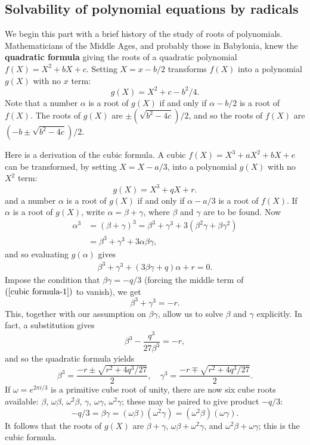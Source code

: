 \subsection{Solvability of polynomial equations by radicals}
We begin this part with a brief history of the study of roots of polynomials. Mathematicians of the Middle Ages, and probably those in Babylonia, knew the \textbf{quadratic formula} giving the roots of a quadratic polynomial $f(X)=X^2+bX+c$. Setting $X=x-b/2$ transforms $f(X)$ into a polynomial $g(X)$ with no $x$ term:
\[g(X)=X^2+c-b^2/4.\]
Note that a number $\alpha$ is a root of $g(X)$ if and only if $\alpha-b/2$ is a root of $f(X)$. The roots of $g(X)$ are $\pm(\sqrt{b^2-4c})/2$, and so the roots of $f(X)$ are $(-b\pm\sqrt{b^2-4c})/2$.\par
Here is a derivation of the cubic formula. A cubic $f(X)=X^3+aX^2+bX+e$ can be transformed, by setting $X=X-a/3$, into a polynomial $g(X)$ with no $X^2$ term:
\[g(X)=X^3+qX+r.\]
and a number $\alpha$ is a root of $g(X)$ if and only if $\alpha-a/3$ is a root of $f(X)$. If $\alpha$ is a root of $g(X)$, write $\alpha=\beta+\gamma$, where $\beta$ and $\gamma$ are to be found. Now
\begin{align*}
\alpha^3&=(\beta+\gamma)^3=\beta^3+\gamma^3+3(\beta^2\gamma+\beta\gamma^2)\\
&=\beta^3+\gamma^3+3\alpha\beta\gamma,
\end{align*}
and so evaluating $g(\alpha)$ gives
\begin{align}\label{cubic formula-1}
\beta^3+\gamma^3+(3\beta\gamma+q)\alpha+r=0.
\end{align}
Impose the condition that $\beta\gamma=-q/3$ (forcing the middle term of $(\ref{cubic formula-1})$ to vanish), we get
\[\beta^3+\gamma^3=-r.\]
This, together with our assumption on $\beta\gamma$, allow us to solve $\beta$ and $\gamma$ explicitly. In fact, a substitution gives
\[\beta^3-\frac{q^3}{27\beta^3}=-r,\]
and so the quadratic formula yields
\[\beta^3=\frac{-r\pm\sqrt{r^2+4q^3/27}}{2},\quad \gamma^3=\frac{-r\mp\sqrt{r^2+4q^3/27}}{2}.\]
If $\omega=e^{2\pi i/3}$ is a primitive cube root of unity, there are now six cube roots available: $\beta$, $\omega\beta$, $\omega^2\beta$, $\gamma$, $\omega\gamma$, $\omega^2\gamma$; these may be paired to give product $-q/3$:
\[-q/3=\beta\gamma=(\omega\beta)(\omega^2\gamma)=(\omega^2\beta)(\omega\gamma).\]
It follows that the roots of $g(X)$ are $\beta+\gamma$, $\omega\beta+\omega^2\gamma$, and $\omega^2\beta+\omega\gamma$; this is the cubic formula.\par
